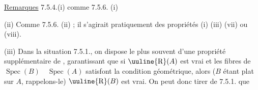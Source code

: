 {\uline{Remarques} 7.5.4.\quad (i) comme 7.5.6. (i)

(ii) Comme 7.5.6. (ii) ; il s'agirait pratiquement des propriétés (i)  (iii) (vii) ou (viii).

(iii) Dans la situation 7.5.1., on dispose le plus souvent d'une propriété supplémentaire de , garantissant que si  $\text{\uuline{R}}(A)$ est vrai et les fibres de $\operatorname{Spec}(B)\quad\operatorname{Spec}(A)$ satisfont la condition  géométrique,  alors  ($B$ étant plat sur $A$, rappelons-le) $\text{\uuline{R}}(B)$ est vrai. On peut donc tirer de 7.5.1. que}
